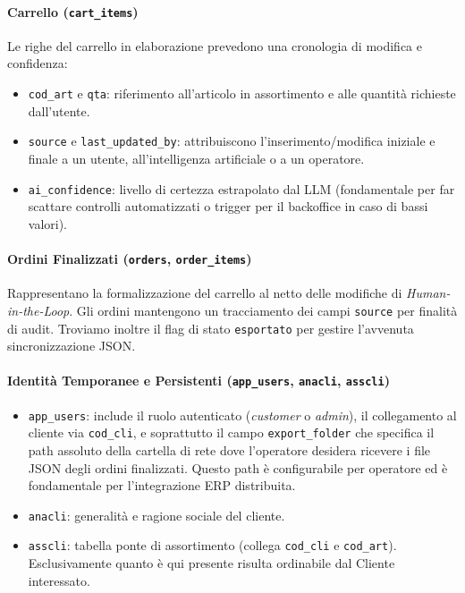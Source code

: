\documentclass[a4paper, 11pt, oneside]{scrartcl}
\begin{document}
\paragraph{Carrello (\texttt{cart\_items})}
Le righe del carrello in elaborazione prevedono una cronologia di modifica e confidenza:
\begin{itemize}
    \item \texttt{cod\_art} e \texttt{qta}: riferimento all'articolo in assortimento e alle quantità richieste dall'utente.
    \item \texttt{source} e \texttt{last\_updated\_by}: attribuiscono l'inserimento/modifica iniziale e finale a un utente, all'intelligenza artificiale o a un operatore.
    \item \texttt{ai\_confidence}: livello di certezza estrapolato dal LLM (fondamentale per far scattare controlli automatizzati o trigger per il backoffice in caso di bassi valori).
\end{itemize}

\paragraph{Ordini Finalizzati (\texttt{orders}, \texttt{order\_items})}
Rappresentano la formalizzazione del carrello al netto delle modifiche di \textit{Human-in-the-Loop}. Gli ordini mantengono un tracciamento dei campi \texttt{source} per finalità di audit. Troviamo inoltre il flag di stato \texttt{esportato} per gestire l'avvenuta sincronizzazione JSON.

\paragraph{Identità Temporanee e Persistenti (\texttt{app\_users}, \texttt{anacli}, \texttt{asscli})}
\begin{itemize}
    \item \texttt{app\_users}: include il ruolo autenticato (\textit{customer} o \textit{admin}), il collegamento al cliente via \texttt{cod\_cli}, e soprattutto il campo \texttt{export\_folder} che specifica il path assoluto della cartella di rete dove l'operatore desidera ricevere i file JSON degli ordini finalizzati. Questo path è configurabile per operatore ed è fondamentale per l'integrazione ERP distribuita.
    \item \texttt{anacli}: generalità e ragione sociale del cliente.
    \item \texttt{asscli}: tabella ponte di assortimento (collega \texttt{cod\_cli} e \texttt{cod\_art}). Esclusivamente quanto è qui presente risulta ordinabile dal Cliente interessato.
\end{itemize}
\end{document}
